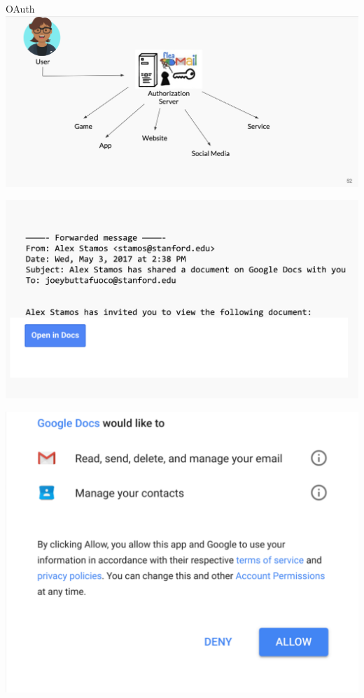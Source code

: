 \documentclass[nobackground,dvipsnames,table,aspectratio=169]{beamer}
\begin{document}
\begin{frame}{OAuth}
    \includegraphics[width=\textwidth]{oauth}
\end{frame}

\begin{frame}{}%
    \thispagestyle{empty}
    \centering
    \includegraphics[width=\textwidth]{phishy}
\end{frame}

\begin{frame}{}%
    \thispagestyle{empty}
    \includegraphics[height=\paperheight]{google-docs-permissions}
\end{frame}
\end{document}
